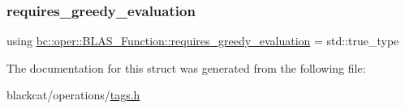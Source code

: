 \subsubsection{\texorpdfstring{requires\+\_\+greedy\+\_\+evaluation}{requires\_greedy\_evaluation}}
{\footnotesize\ttfamily using \hyperlink{structbc_1_1oper_1_1BLAS__Function_ad4e5dabb543b1971a20884c4c1a68443}{bc\+::oper\+::\+B\+L\+A\+S\+\_\+\+Function\+::requires\+\_\+greedy\+\_\+evaluation} =  std\+::true\+\_\+type}



The documentation for this struct was generated from the following file\+:\begin{DoxyCompactItemize}
\item 
blackcat/operations/\hyperlink{tags_8h}{tags.\+h}\end{DoxyCompactItemize}
